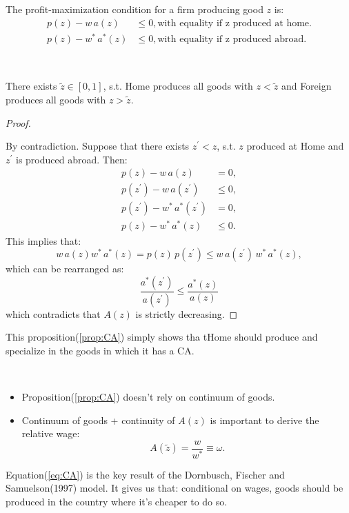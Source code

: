The profit-maximization condition for a firm producing good $z$ is:
\begin{align*}
    p(z) - w\,a(z) &\leq 0, \text{with equality if z produced at home.} \\
    p(z) - w^*\,a^*(z) &\leq 0, \text{with equality if z produced abroad.}  
\end{align*}
\begin{proposition}\label{prop:CA}
    \

    There exists $\tilde{z} \in [0,1]$, s.t. Home produces all goods with $z < \tilde{z}$ 
    and Foreign produces all goods with $z > \tilde{z}$.
\end{proposition}
\begin{proof}
    \

    By contradiction. Suppose that there exists $z^{\prime} < z$, s.t. $z$ produced at Home
    and $z^{\prime} $ is produced abroad. Then:
    \begin{align*}
        p(z) - w\,a(z) &= 0, \\
        p(z^{\prime}) - w\,a(z^{\prime}) &\leq 0, \\
        p(z^{\prime}) - w^*\,a^*(z^{\prime}) &= 0, \\
        p(z) - w^*\,a^*(z) &\leq 0.
    \end{align*}
    This implies that:
    \[w\,a(z)w^*\,a^*(z) = p(z)\,p(z^{\prime}) \leq w\,a(z^{\prime})\,w^*\,a^*(z),\]
    which can be rearranged as:
    \[\frac{a^*(z^{\prime})}{a(z^{\prime})} \leq \frac{a^*(z)}{a(z)}\]
    which contradicts that $A(z)$ is strictly decreasing.
\end{proof}

This proposition(\ref{prop:CA}) simply shows tha tHome should produce and specialize in
the goods in which it has a CA.

\begin{note}
    \

    \begin{itemize}
        \item Proposition(\ref{prop:CA}) doesn't rely on continuum of goods.
        \item Continuum of goods + continuity of $A(z)$ is important to derive the relative wage:
        \begin{equation}\label{eq:CA}
            A(\tilde{z}) = \frac{w}{w^*} \equiv \omega.
        \end{equation}
    \end{itemize}
    Equation(\ref{eq:CA}) is the key result of the Dornbusch, Fischer and Samuelson(1997) model.
    It gives us that: conditional on wages, goods should be produced in the country where it's cheaper to do so.
\end{note}

